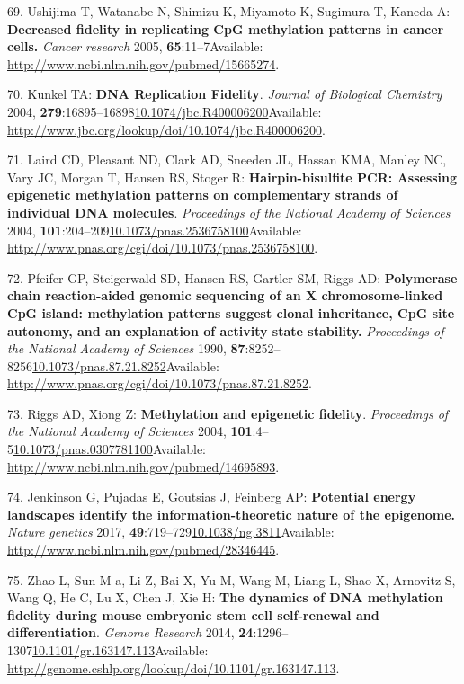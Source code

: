 \documentclass[
]{book}
\begin{document}
\leavevmode\hypertarget{ref-Ushijima2005}{}%
69. Ushijima T, Watanabe N, Shimizu K, Miyamoto K, Sugimura T, Kaneda A: \textbf{Decreased fidelity in replicating CpG methylation patterns in cancer cells.} \emph{Cancer research} 2005, \textbf{65}:11--7Available: \url{http://www.ncbi.nlm.nih.gov/pubmed/15665274}.

\leavevmode\hypertarget{ref-Kunkel2004a}{}%
70. Kunkel TA: \textbf{DNA Replication Fidelity}. \emph{Journal of Biological Chemistry} 2004, \textbf{279}:16895--16898\href{https://doi.org/10.1074/jbc.R400006200}{10.1074/jbc.R400006200}Available: \url{http://www.jbc.org/lookup/doi/10.1074/jbc.R400006200}.

\leavevmode\hypertarget{ref-Laird2004}{}%
71. Laird CD, Pleasant ND, Clark AD, Sneeden JL, Hassan KMA, Manley NC, Vary JC, Morgan T, Hansen RS, Stoger R: \textbf{Hairpin-bisulfite PCR: Assessing epigenetic methylation patterns on complementary strands of individual DNA molecules}. \emph{Proceedings of the National Academy of Sciences} 2004, \textbf{101}:204--209\href{https://doi.org/10.1073/pnas.2536758100}{10.1073/pnas.2536758100}Available: \url{http://www.pnas.org/cgi/doi/10.1073/pnas.2536758100}.

\leavevmode\hypertarget{ref-Pfeifer1990a}{}%
72. Pfeifer GP, Steigerwald SD, Hansen RS, Gartler SM, Riggs AD: \textbf{Polymerase chain reaction-aided genomic sequencing of an X chromosome-linked CpG island: methylation patterns suggest clonal inheritance, CpG site autonomy, and an explanation of activity state stability.} \emph{Proceedings of the National Academy of Sciences} 1990, \textbf{87}:8252--8256\href{https://doi.org/10.1073/pnas.87.21.8252}{10.1073/pnas.87.21.8252}Available: \url{http://www.pnas.org/cgi/doi/10.1073/pnas.87.21.8252}.

\leavevmode\hypertarget{ref-Riggs2004a}{}%
73. Riggs AD, Xiong Z: \textbf{Methylation and epigenetic fidelity}. \emph{Proceedings of the National Academy of Sciences} 2004, \textbf{101}:4--5\href{https://doi.org/10.1073/pnas.0307781100}{10.1073/pnas.0307781100}Available: \url{http://www.ncbi.nlm.nih.gov/pubmed/14695893}.

\leavevmode\hypertarget{ref-Jenkinson2017}{}%
74. Jenkinson G, Pujadas E, Goutsias J, Feinberg AP: \textbf{Potential energy landscapes identify the information-theoretic nature of the epigenome.} \emph{Nature genetics} 2017, \textbf{49}:719--729\href{https://doi.org/10.1038/ng.3811}{10.1038/ng.3811}Available: \url{http://www.ncbi.nlm.nih.gov/pubmed/28346445}.

\leavevmode\hypertarget{ref-Zhao2014}{}%
75. Zhao L, Sun M-a, Li Z, Bai X, Yu M, Wang M, Liang L, Shao X, Arnovitz S, Wang Q, He C, Lu X, Chen J, Xie H: \textbf{The dynamics of DNA methylation fidelity during mouse embryonic stem cell self-renewal and differentiation}. \emph{Genome Research} 2014, \textbf{24}:1296--1307\href{https://doi.org/10.1101/gr.163147.113}{10.1101/gr.163147.113}Available: \url{http://genome.cshlp.org/lookup/doi/10.1101/gr.163147.113}.
\end{document}
